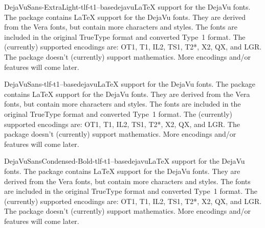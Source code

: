 \documentclass{ddltxtyp}
\begin{document}
\begin{package}{DejaVuSans-ExtraLight-tlf-t1--base}{dejavu}{{\LaTeX} support for the DejaVu fonts.}
The package contains {\LaTeX} support for the DejaVu fonts. They
are derived from the Vera fonts, but contain more characters
and styles. The fonts are included in the original TrueType
format and converted Type~1 format. The (currently) supported
encodings are: OT1, T1, IL2, TS1, T2*, X2, QX, and LGR. The
package doesn't (currently) support mathematics. More encodings
and/or features will come later.
\end{package}


\begin{package}{DejaVuSans-tlf-t1--base}{dejavu}{{\LaTeX} support for the DejaVu fonts.}
The package contains {\LaTeX} support for the DejaVu fonts. They
are derived from the Vera fonts, but contain more characters
and styles. The fonts are included in the original TrueType
format and converted Type~1 format. The (currently) supported
encodings are: OT1, T1, IL2, TS1, T2*, X2, QX, and LGR. The
package doesn't (currently) support mathematics. More encodings
and/or features will come later.
\end{package}

\begin{package}{DejaVuSansCondensed-Bold-tlf-t1--base}{dejavu}{{\LaTeX} support for the DejaVu fonts.}
The package contains {\LaTeX} support for the DejaVu fonts. They
are derived from the Vera fonts, but contain more characters
and styles. The fonts are included in the original TrueType
format and converted Type~1 format. The (currently) supported
encodings are: OT1, T1, IL2, TS1, T2*, X2, QX, and LGR. The
package doesn't (currently) support mathematics. More encodings
and/or features will come later.
\end{package}

\end{document}
